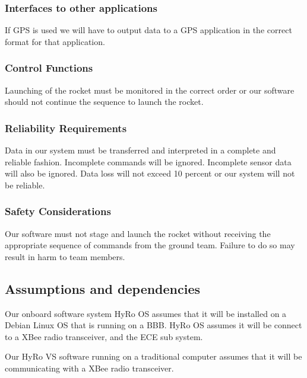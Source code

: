 \documentclass[10pt,draftclsnofoot,onecolumn,compsoc]{IEEEtran}
\begin{document}
\subsubsection{\bf  Interfaces to other applications} If GPS is used we will have to output data to a GPS application in the correct format for that application.
\subsubsection{\bf Control Functions} Launching of the rocket must be monitored in the correct order or our software should not continue the sequence to launch the rocket.
\subsubsection{\bf Reliability Requirements} Data in our system must be transferred and interpreted in a complete and reliable fashion. Incomplete commands will be ignored. Incomplete sensor data will also be ignored. Data loss will not exceed 10 percent or our system will not be reliable.
\subsubsection{\bf Safety Considerations} Our software must not stage and launch the rocket without receiving the appropriate sequence of commands from the ground team. Failure to do so may result in harm to team members.

\subsection{Assumptions and dependencies}
Our onboard software system HyRo OS assumes that it will be installed on a Debian Linux OS that is running on a BBB.  HyRo OS assumes it will be connect to a XBee radio transceiver, and the ECE sub system.\par

	Our HyRo VS software running on a traditional computer assumes that it will be communicating with a XBee radio transceiver.
\end{document}
